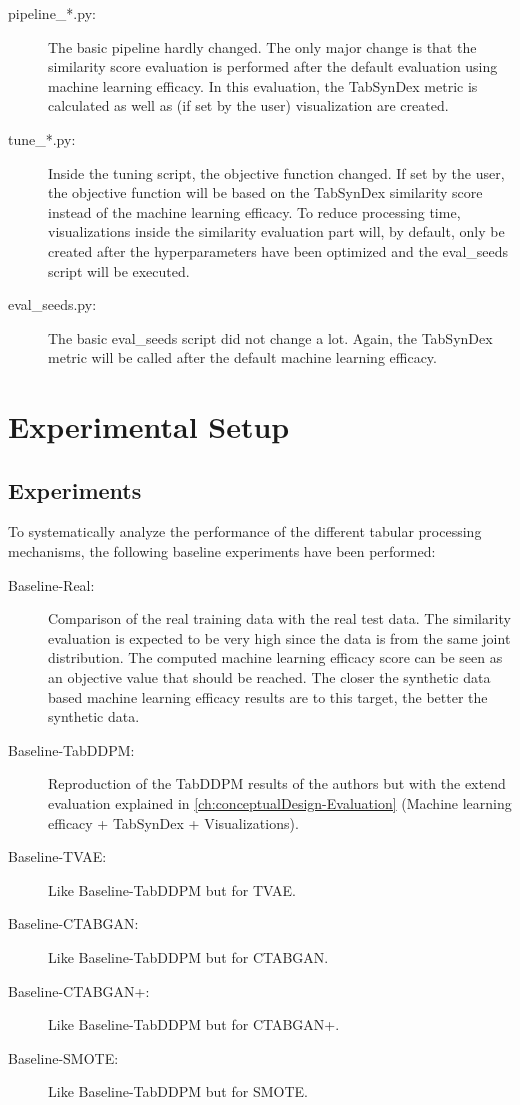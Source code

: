 \begin{description}
	\item[pipeline\_*.py:]
		The basic pipeline hardly changed.
		The only major change is that the similarity score evaluation is performed after the default evaluation using machine learning efficacy.
		In this evaluation, the TabSynDex metric is calculated as well as (if set by the user) visualization are created.

	\item[tune\_*.py:]
		Inside the tuning script, the objective function changed.
		If set by the user, the objective function will be based on the TabSynDex similarity score instead of the machine learning efficacy.
		To reduce processing time, visualizations inside the similarity evaluation part will, by default, only be created after the hyperparameters have been optimized and the eval\_seeds script will be executed.

	\item[eval\_seeds.py:]
		The basic eval\_seeds script did not change a lot.
		Again, the TabSynDex metric will be called after the default machine learning efficacy.
\end{description}

\section{Experimental Setup}
\label{ch:methods-experimentalSetup}

\subsection{Experiments}
\label{ch:Experiments}

To systematically analyze the performance of the different tabular processing mechanisms, the following baseline experiments have been performed:

\begin{description}
	\item[Baseline-Real:] Comparison of the real training data with the real test data.
		The similarity evaluation is expected to be very high since the data is from the same joint distribution.
		The computed machine learning efficacy score can be seen as an objective value that should be reached.
		The closer the synthetic data based machine learning efficacy results are to this target, the better the synthetic data.
	\item[Baseline-TabDDPM:] Reproduction of the TabDDPM results of the authors \cite{kotelnikov2022TabDDPMModellingTabular} but with the extend evaluation explained in \autoref{ch:conceptualDesign-Evaluation} (Machine learning efficacy + TabSynDex + Visualizations).
	\item[Baseline-TVAE:] Like Baseline-TabDDPM but for TVAE.
	\item[Baseline-CTABGAN:] Like Baseline-TabDDPM but for CTABGAN.
	\item[Baseline-CTABGAN+:] Like Baseline-TabDDPM but for CTABGAN+.
	\item[Baseline-SMOTE:] Like Baseline-TabDDPM but for SMOTE.
\end{description}

